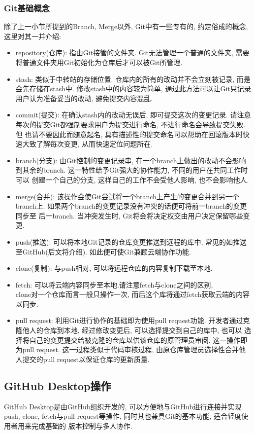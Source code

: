 \subsubsection{Git基础概念}
除了上一小节所提到的Branch, Merge以外, Git中有一些专有的, 约定俗成的概念, 这里对其一并介绍:
\begin{itemize}
      \item repository(仓库): 指由Git接管的文件夹. Git无法管理一个普通的文件夹, 需要将普通文件夹用Git初始化为仓库后才可以被Git所管理.
      \item stash: 类似于中转站的存储位置. 仓库内的所有的改动并不会立刻被记录, 而是会先存储在stash中. 修改stash中的内容较为简单,
            通过此方法可以让Git只记录用户认为准备妥当的改动, 避免提交内容混乱.
      \item commit(提交): 在确认stash内的改动无误后, 即可提交这次的变更记录. 请注意每次的提交Git都强制要求用户为提交进行命名, 不进行命名会导致提交失败. 但
            也请不要因此而随意起名, 具有描述性的提交命名可以帮助在回滚版本时快速大致了解每次变更, 从而快速定位问题所在.
      \item branch(分支): 由Git控制的变更记录串, 在一个branch上做出的改动不会影响到其余的branch. 这一特性给予Git强大的协作能力, 不同的用户在共同工作时可以
            创建一个自己的分支, 这样自己的工作不会受他人影响, 也不会影响他人.
      \item merge(合并): 该操作会使Git尝试将一个branch上产生的变更合并到另一个branch上. 如果两个branch的变更记录没有冲突的话便可将前一branch的变更同步至
            后一branch. 当冲突发生时, Git将会将决定权交由用户决定保留哪些变更.
      \item push(推送): 可以将本地Git记录的仓库变更推送到远程的库中, 常见的如推送至GitHub(后文将介绍). 如此便可使Git兼顾云端协作功能.
      \item clone(复制): 与push相对, 可以将远程仓库的内容复制下载至本地.
      \item fetch: 可以将云端内容同步至本地.请注意fetch与clone之间的区别, \\clone对一个仓库而言一般只操作一次, 而后这个库将通过fetch获取云端的内容以同步.
      \item pull request: 利用Git进行协作的基础即为使用pull request功能. 开发者通过克隆他人的仓库到本地, 经过修改变更后, 可以选择提交到自己的库中, 也可以
            选择将自己的变更提交给被克隆的仓库以供该仓库的原管理员审阅. 这一操作即为pull request. 这一过程类似于代码审核过程, 由原仓库管理员选择性合并他人提交的pull
            request以保证仓库的更新质量.
\end{itemize}
\subsection{GitHub Desktop操作}
GitHub Desktop是由GitHub组织开发的, 可以方便地与GitHub进行连接并实现push, clone, fetch与pull request等操作, 同时其也兼具Git的基本功能, 适合轻度使用者用来完成基础的
版本控制与多人协作.

